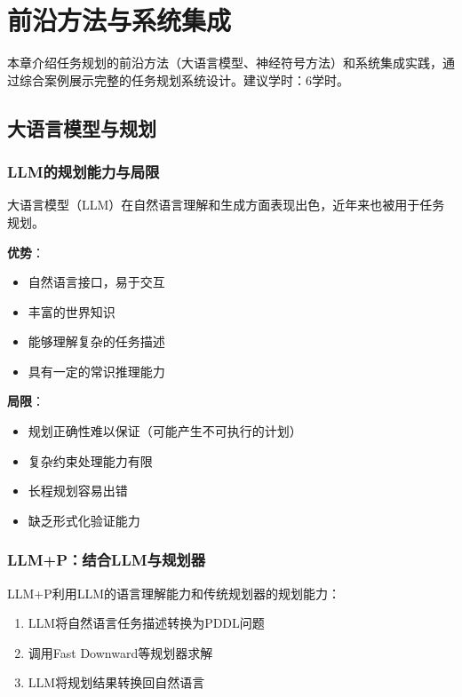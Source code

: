 \chapter{前沿方法与系统集成}

\begin{levelbox}
本章介绍任务规划的前沿方法（大语言模型、神经符号方法）和系统集成实践，通过综合案例展示完整的任务规划系统设计。建议学时：6学时。
\end{levelbox}

\section{大语言模型与规划}

\subsection{LLM的规划能力与局限}

大语言模型（LLM）在自然语言理解和生成方面表现出色，近年来也被用于任务规划。

\begin{keypoint}[LLM规划的优势与局限]
\textbf{优势}：
\begin{itemize}
  \item 自然语言接口，易于交互
  \item 丰富的世界知识
  \item 能够理解复杂的任务描述
  \item 具有一定的常识推理能力
\end{itemize}

\textbf{局限}：
\begin{itemize}
  \item 规划正确性难以保证（可能产生不可执行的计划）
  \item 复杂约束处理能力有限
  \item 长程规划容易出错
  \item 缺乏形式化验证能力
\end{itemize}
\end{keypoint}

\subsection{LLM+P：结合LLM与规划器}

\begin{definition}
LLM+P利用LLM的语言理解能力和传统规划器的规划能力：
\begin{enumerate}
  \item LLM将自然语言任务描述转换为PDDL问题
  \item 调用Fast Downward等规划器求解
  \item LLM将规划结果转换回自然语言
\end{enumerate}
\end{definition}

